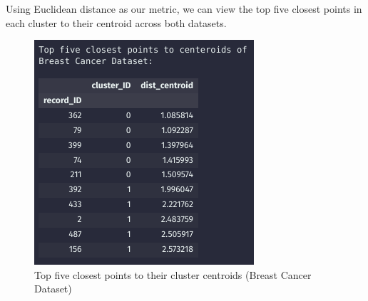 \documentclass{article}
\begin{document}
Using Euclidean distance as our metric, we can view the top five closest points in each cluster to their centroid across both datasets.
\begin{figure}[H]
    \centering
    \begin{minipage}[b]{0.47\textwidth}
        \centering
        \includegraphics[width=\textwidth, height=0.3\textheight]{top_five_cancer.png}
        \caption{Top five closest points to their cluster centroids (Breast Cancer Dataset)}
    \end{minipage}
    \hfill
    \begin{minipage}[b]{0.47\textwidth}
        \centering

\end{minipage}
\end{figure}
\end{document}
